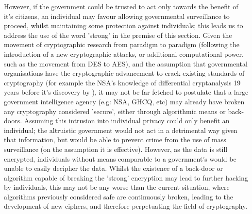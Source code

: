 \documentclass[british,10pt,a4paper]{article}
\begin{document}
However, if the government could be trusted to act only towards the benefit of it's citizens, an individual may favour allowing governmental surveillance to proceed, whilst maintaining some protection against individuals; this leads us to address the use of the word 'strong' in the premise of this section. Given the movement of cryptographic research from paradigm to paradigm (following the introduction of a new cryptographic attacks, or additional computational power, such as the movement from DES to AES), and the assumption that governmental organisations have the cryptographic advancement to crack existing standards of cryptography (for example the NSA's knowledge of differential cryptanalysis 19 years before it's discovery by \citet{biham}), it may not be far fetched to postulate that a large government intelligence agency (e.g: NSA, GHCQ, etc) may already have broken any cryptography considered 'secure', either through algorithmic means or back-doors. Assuming this intrusion into individual privacy could only benefit an individual; the altruistic government would not act in a detrimental way given that information, but would be able to prevent crime from the use of mass surveillance (on the assumption it is effective). However, as the data is still encrypted, individuals without means comparable to a government's would be unable to easily decipher the data. Whilst the existence of a back-door or algorithm capable of breaking the 'strong' encryption may lead to further hacking by individuals, this may not be any worse than the current situation, where algorithms previously considered safe are continuously broken, leading to the development of new ciphers, and therefore perpetuating the field of cryptography.
\end{document}
